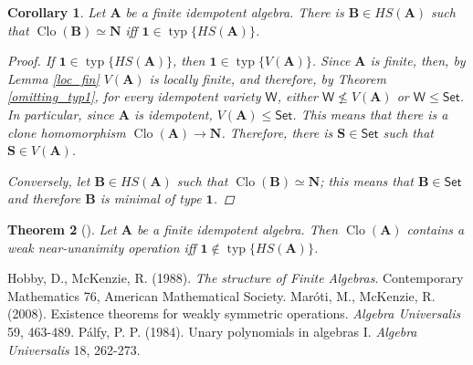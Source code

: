 \documentclass{amsart}
\theoremstyle{plain}
\newtheorem{theorem}{Theorem}[section]
\newtheorem{corollary}[theorem]{Corollary}
\theoremstyle{definition}
\theoremstyle{remark}
\DeclareMathOperator{\Clo}{Clo}
\DeclareMathOperator{\typ}{typ}
\begin{document}
\begin{corollary}
    Let $\mathbf{A}$ be a finite idempotent algebra. 
    There is $\mathbf{B} \in HS(\mathbf{A})$ such that $\Clo(\mathbf{B}) \simeq \mathbf{N}$ iff $\mathbf{1} \in \typ\{HS(\mathbf{A})\}$. 
    \begin{proof}
        If $\mathbf{1} \in \typ\{HS(\mathbf{A})\}$, then $\mathbf{1} \in \typ\{V(\mathbf{A})\}$. 
        Since $\mathbf{A}$ is finite, then, by Lemma \ref{loc_fin} $V(\mathbf{A})$ is locally finite, 
        and therefore, by Theorem \ref{omitting_typ1}, for every idempotent variety $\mathsf{W}$, either $\mathsf{W} \nleq V(\mathbf{A})$ or $\mathsf{W} \le \mathsf{Set}$. 
        In particular, since $\mathbf{A}$ is idempotent, $V(\mathbf{A}) \le \mathsf{Set}$. 
        This means that there is a clone homomorphism $\Clo(\mathbf{A}) \to \mathbf{N}$. 
        Therefore, there is $\mathbf{S} \in \mathsf{Set}$ such that $\mathbf{S} \in V(\mathbf{A})$. 

        Conversely, let $\mathbf{B} \in HS(\mathbf{A})$ such that $\Clo(\mathbf{B}) \simeq \mathbf{N}$; 
        this means that $\mathbf{B} \in \mathsf{Set}$ and therefore $\mathbf{B}$ is minimal of type $\mathbf{1}$. 
    \end{proof}
\end{corollary}

\begin{theorem}
    [\cite{wnu}]
    Let $\mathbf{A}$ be a finite idempotent algebra. 
    Then $\Clo(\mathbf{A})$ contains a weak near-unanimity operation iff $\mathbf{1} \notin \typ\{HS(\mathbf{A})\}$. 
\end{theorem}

\begin{thebibliography}{9}
    Hobby, D., McKenzie, R. (1988). \emph{The structure of Finite Algebras}. Contemporary Mathematics 76, American Mathematical Society.  
    Mar\'oti, M., McKenzie, R. (2008). Existence theorems for weakly symmetric operations. \emph{Algebra Universalis} 59, 463-489.
    P\'alfy, P. P. (1984). Unary polynomials in algebras I. \emph{Algebra Universalis} 18, 262-273.
 \end{thebibliography}
\end{document}
